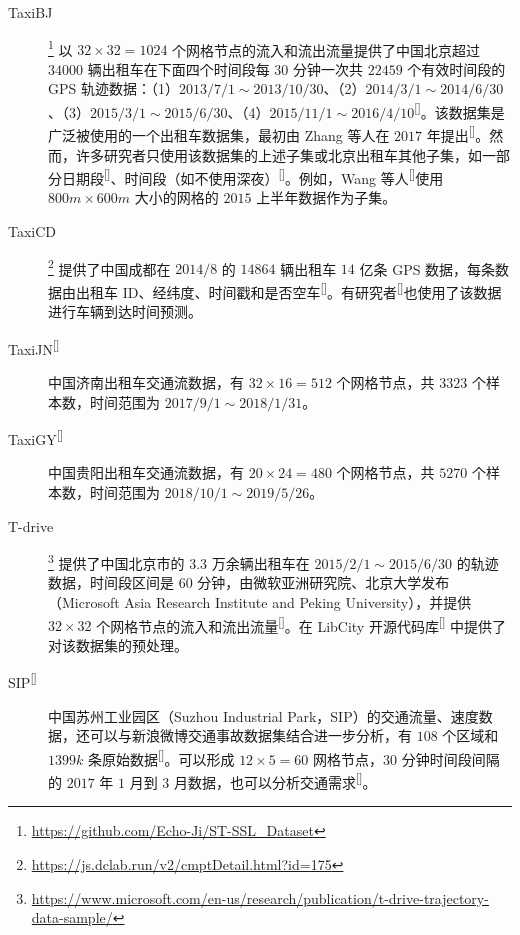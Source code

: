 \documentclass{ctexart}
\renewcommand{\cite}[1]{\textsuperscript{[\citenum{#1}]}}
\begin{document}
\begin{description}
    \item[TaxiBJ]\footnote{\url{https://github.com/Echo-Ji/ST-SSL_Dataset}} 以 $32\times32=1024$ 个网格节点的流入和流出流量提供了中国北京超过 $34000$ 辆出租车在下面四个时间段每 $30$ 分钟一次共 $22459$ 个有效时间段的 GPS 轨迹数据：（1）$2013/7/1\sim2013/10/30$、（2）$2014/3/1\sim2014/6/30$、（3）$2015/3/1\sim2015/6/30$、（4）$2015/11/1\sim2016/4/10$\cite{T-ZS2}。该数据集是广泛被使用的一个出租车数据集，最初由 Zhang 等人在 $2017$ 年提出\cite{T-51}。然而，许多研究者只使用该数据集的上述子集或北京出租车其他子集，如一部分日期段\cite{T-274}、时间段（如不使用深夜）\cite{T-205}。例如，Wang 等人\cite{T-343}使用 $800m\times600m$ 大小的网格的 $2015$ 上半年数据作为子集。
    \item[TaxiCD]\footnote{\url{https://js.dclab.run/v2/cmptDetail.html?id=175}} 提供了中国成都在 $2014/8$ 的 $14864$ 辆出租车 $14$ 亿条 GPS 数据，每条数据由出租车 ID、经纬度、时间戳和是否空车\cite{T-ZS2}。有研究者\cite{T-366}也使用了该数据进行车辆到达时间预测。%
    \item[TaxiJN\cite{T-314}] 中国济南出租车交通流数据，有 $32\times16=512$ 个网格节点，共 $3323$ 个样本数，时间范围为 $2017/9/1\sim2018/1/31$。
    \item[TaxiGY\cite{T-314}] 中国贵阳出租车交通流数据，有 $20\times24=480$ 个网格节点，共 $5270$ 个样本数，时间范围为 $2018/10/1\sim2019/5/26$。
    \item[T-drive]\footnote{\url{https://www.microsoft.com/en-us/research/publication/t-drive-trajectory-data-sample/}} 提供了中国北京市的 $3.3$ 万余辆出租车在 $2015/2/1\sim2015/6/30$ 的轨迹数据，时间段区间是 $60$ 分钟，由微软亚洲研究院、北京大学发布（Microsoft Asia Research Institute and Peking University），并提供 $32\times32$ 个网格节点的流入和流出流量\cite{T-151}。在 LibCity 开源代码库\cite{O-32} 中提供了对该数据集的预处理。
    \item[SIP\cite{T-92}] 中国苏州工业园区（Suzhou Industrial Park，SIP）的交通流量、速度数据，还可以与新浪微博交通事故数据集结合进一步分析，有 $108$ 个区域和 $1399k$ 条原始数据\cite{T-92}。可以形成 $12\times5=60$ 网格节点，$30$ 分钟时间段间隔的 $2017$ 年 $1$ 月到 $3$ 月数据，也可以分析交通需求\cite{T-283}。

\end{description}
\end{document}
